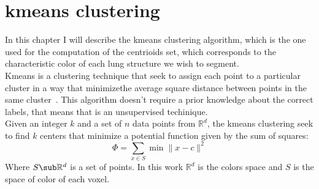 \documentclass{standalone}
\begin{document}
	\chapter*{kmeans clustering}
	
	In this chapter I will describe the kmeans clustering algorithm, which is the one used for the computation of the centrioids set, which corresponds to the characteristic color of each lung structure we wish to segment.\\
	Kmeans is a clustering technique that seek to assign each point to a particular cluster in a way that minimizethe average square distance between points in the same cluster~\cite{Arthur2007}. This algorithm doesn't require a prior knowledge about the correct labels, that means that is an unsupervised techinique.\\
	Given an integer $k$ and a set of $n$ data points from $\mathbb{R}^d$, the kmeans clustering seek to find $k$ centers that minimize a potential function given by the sum of squares: 
	\begin{equation}
		\Phi = \sum_{x\in S}\min\| x - c\|^2
	\end{equation} 
	Where $S\sub \mathbb R^d$ is a set of points. In this work $\mathbb{R}^d$ is the colors space and $S$ is the space of color of each voxel.
	
	
\end{document}
